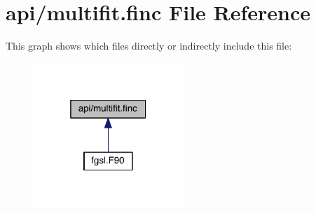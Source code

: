 \hypertarget{multifit_8finc}{\section{api/multifit.finc File Reference}
\label{multifit_8finc}
}
This graph shows which files directly or indirectly include this file\-:\nopagebreak
\begin{figure}[H]
\begin{center}
\leavevmode
\includegraphics[width=160pt]{multifit_8finc__dep__incl}
\end{center}
\end{figure}
